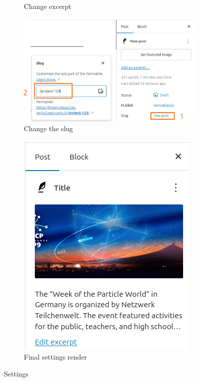 \begin{figure}[h!]
\begin{subfigure}[b]{0.4\textwidth}
        \caption{Change excerpt}
        \label{fig:excerpt}
    \end{subfigure}
    \bigskip
    \vspace{.1cm}
    \begin{subfigure}[b]{0.6\textwidth}
        \centering
        \includegraphics[width=\textwidth]{Image/Process/slug.png}
        \caption{Change the slug}
        \label{fig:slug}
    \end{subfigure}
    \hfill
    \begin{subfigure}[b]{0.3\textwidth}
        \centering
        \includegraphics[width=\linewidth]{Image/Process/final_settings.png}
        \caption{Final settings render}
        \label{fig:final_settings}
    \end{subfigure}
    \caption{Settings}
\end{figure}

